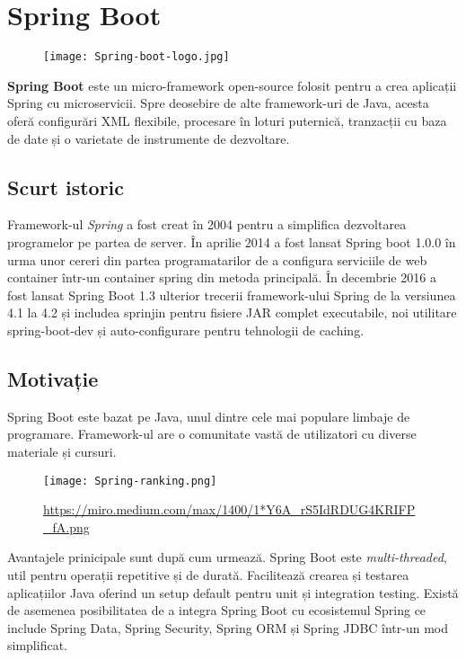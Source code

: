 \section{Spring Boot}
\begin{figure}[H]
	\centering
	\texttt{[image: Spring-boot-logo.jpg]}
\end{figure}

\textbf{Spring Boot} este un micro-framework open-source folosit pentru a crea aplicații Spring cu microservicii. Spre deosebire de alte framework-uri de Java, acesta oferă configurări XML flexibile, 
procesare în loturi puternică, tranzacții cu baza de date și o varietate de instrumente de dezvoltare.

\subsection{Scurt istoric}
Framework-ul \textit{Spring} a fost creat în 2004 pentru a simplifica dezvoltarea programelor pe partea de server. În aprilie 2014 a fost lansat Spring boot 1.0.0 în urma unor cereri din partea programatarilor de a configura serviciile de web container într-un container spring din metoda principală. În decembrie 2016 a fost lansat Spring Boot 1.3 ulterior trecerii framework-ului Spring de la versiunea 4.1 la 4.2 și includea sprinjin pentru fisiere JAR complet executabile, noi utilitare spring-boot-dev și auto-configurare pentru tehnologii de caching. 

\subsection{Motivație}
Spring Boot este bazat pe Java, unul dintre cele mai populare limbaje de programare. Framework-ul are o comunitate vastă de utilizatori cu diverse materiale și cursuri.

\begin{figure}[H]
	\centering
	\texttt{[image: Spring-ranking.png]}
	\caption{\url{https://miro.medium.com/max/1400/1*Y6A_rS5IdRDUG4KRIFP_fA.png}}
\end{figure}

Avantajele prinicipale sunt după cum urmează. Spring Boot este \textit{multi-threaded}, util pentru operații repetitive și de durată. Facilitează crearea și testarea aplicațiilor Java oferind un setup default pentru unit și integration testing. Există de asemenea posibilitatea de a integra Spring Boot cu ecosistemul Spring ce include Spring Data, Spring Security, Spring ORM și Spring JDBC într-un mod simplificat.

